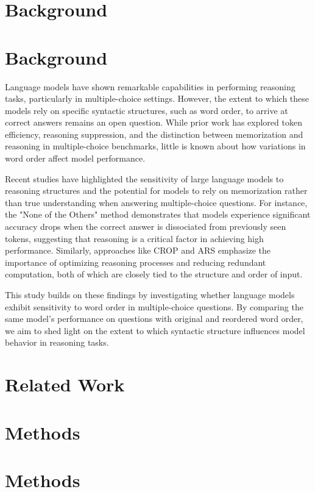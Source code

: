 \documentclass{article}
\begin{document}
\section{Background}
\section*{Background}

Language models have shown remarkable capabilities in performing reasoning tasks, particularly in multiple-choice settings. However, the extent to which these models rely on specific syntactic structures, such as word order, to arrive at correct answers remains an open question. While prior work has explored token efficiency, reasoning suppression, and the distinction between memorization and reasoning in multiple-choice benchmarks, little is known about how variations in word order affect model performance. 

Recent studies have highlighted the sensitivity of large language models to reasoning structures and the potential for models to rely on memorization rather than true understanding when answering multiple-choice questions. For instance, the "None of the Others" method demonstrates that models experience significant accuracy drops when the correct answer is dissociated from previously seen tokens, suggesting that reasoning is a critical factor in achieving high performance. Similarly, approaches like CROP and ARS emphasize the importance of optimizing reasoning processes and reducing redundant computation, both of which are closely tied to the structure and order of input.

This study builds on these findings by investigating whether language models exhibit sensitivity to word order in multiple-choice questions. By comparing the same model's performance on questions with original and reordered word order, we aim to shed light on the extent to which syntactic structure influences model behavior in reasoning tasks.
\section{Related Work}

\section{Methods}
\section*{Methods}
\end{document}
